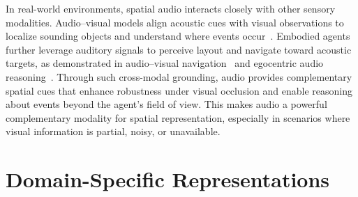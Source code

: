 In real-world environments, spatial audio interacts closely with other sensory modalities.
Audio–visual models align acoustic cues with visual observations to localize sounding objects and understand where events occur~\cite{morgado2018self,afouras2020self,morgado2020learning}.
Embodied agents further leverage auditory signals to perceive layout and navigate toward acoustic targets, as demonstrated in audio–visual navigation~\cite{chen2020soundspaces} and egocentric audio reasoning~\cite{zheng2024bat,biswas2025owl}.
Through such cross-modal grounding, audio provides complementary spatial cues that enhance robustness under visual occlusion and enable reasoning about events beyond the agent's field of view.
This makes audio a powerful complementary modality for spatial representation, especially in scenarios where visual information is partial, noisy, or unavailable.












\section{Domain-Specific Representations}
\label{sec:rep_other}

